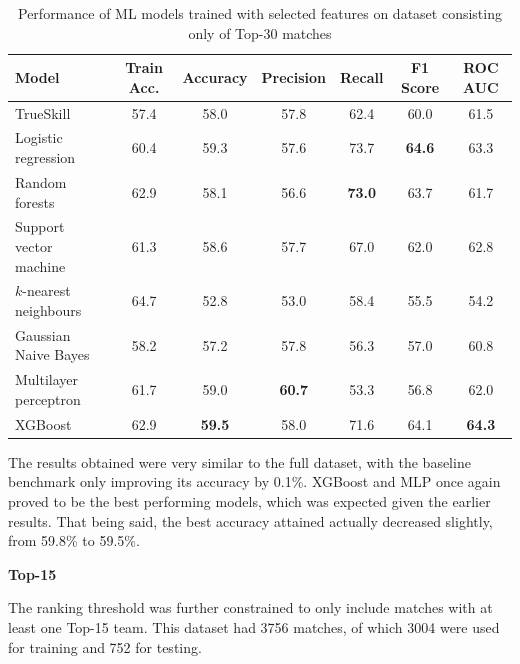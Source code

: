 \begin{table}[h!]
	\centering
	\small
	\begin{adjustbox}{center} %
		\begin{tabular}{ |l|c|c|c|c|c|c| }
			\hline
			\rule{0pt}{2.6ex} \textbf{Model} & \textbf{Train Acc.} & \textbf{Accuracy} & \textbf{Precision} & \textbf{Recall} & \textbf{F1 Score} & \textbf{ROC AUC} \\
			\hline
			\rule{0pt}{2.6ex} TrueSkill 				& 57.4 & 58.0 & 57.8 & 62.4 & 60.0 & 61.5 \\ \hline
			\rule{0pt}{2.6ex} Logistic regression 		& 60.4 & 59.3 & 57.6 & 73.7 & \textbf{64.6} & 63.3 \\
			\rule{0pt}{2.6ex} Random forests 			& 62.9 & 58.1 & 56.6 & \textbf{73.0} & 63.7 & 61.7 \\
			\rule{0pt}{2.6ex} Support vector machine 	& 61.3 & 58.6 & 57.7 & 67.0 & 62.0 & 62.8 \\
			\rule{0pt}{2.6ex} $k$-nearest neighbours 	& 64.7 & 52.8 & 53.0 & 58.4 & 55.5 & 54.2 \\
			\rule{0pt}{2.6ex} Gaussian Naive Bayes 		& 58.2 & 57.2 & 57.8 & 56.3 & 57.0 & 60.8 \\
			\rule{0pt}{2.6ex} Multilayer perceptron		& 61.7 & 59.0 & \textbf{60.7} & 53.3 & 56.8 & 62.0 \\
			\rule{0pt}{2.6ex} XGBoost 					& 62.9 & \textbf{59.5} & 58.0 & 71.6 & 64.1 & \textbf{64.3} \\
			\hline
		\end{tabular}
	\end{adjustbox}
	\caption{Performance of ML models trained with selected features on dataset consisting only of Top-30 matches}
	\label{table:4}
\end{table}

The results obtained were very similar to the full dataset, with the baseline benchmark only improving its accuracy by 0.1\%. XGBoost and MLP once again proved to be the best performing models, which was expected given the earlier results. That being said, the best accuracy attained actually decreased slightly, from 59.8\% to 59.5\%.

\textbf{Top-15}

The ranking threshold was further constrained to only include matches with at least one Top-15 team. This dataset had 3756 matches, of which 3004 were used for training and 752 for testing.

